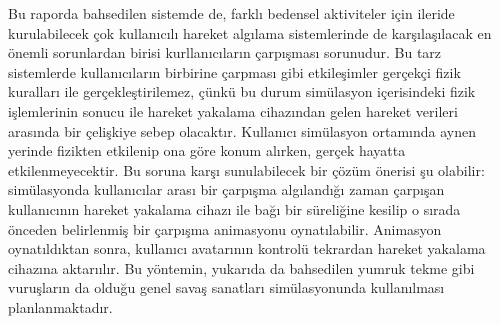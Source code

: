 \documentclass[a4paper, 12pt, titlepage]{article}
\begin{document}
Bu raporda bahsedilen sistemde de, farklı bedensel aktiviteler için ileride kurulabilecek çok kullanıcılı
hareket algılama sistemlerinde de karşılaşılacak en önemli sorunlardan birisi kurllanıcıların çarpışması
sorunudur. Bu tarz sistemlerde kullanıcıların birbirine çarpması gibi etkileşimler gerçekçi fizik kuralları
ile gerçekleştirilemez, çünkü bu durum simülasyon içerisindeki fizik işlemlerinin sonucu ile hareket
yakalama cihazından gelen hareket verileri arasında bir çelişkiye sebep olacaktır. Kullanıcı simülasyon
ortamında aynen yerinde fizikten etkilenip ona göre konum alırken, gerçek hayatta etkilenmeyecektir. Bu
soruna karşı sunulabilecek bir çözüm önerisi şu olabilir: simülasyonda kullanıcılar arası bir çarpışma
algılandığı zaman çarpışan kullanıcının hareket yakalama cihazı ile bağı bir süreliğine kesilip o sırada
önceden belirlenmiş bir çarpışma animasyonu oynatılabilir. Animasyon oynatıldıktan sonra, kullanıcı
avatarının kontrolü tekrardan hareket yakalama cihazına aktarıılır. Bu yöntemin, yukarıda da bahsedilen
yumruk tekme gibi vuruşların da olduğu genel savaş sanatları simülasyonunda kullanılması planlanmaktadır.

\newpage

 
\end{document}
